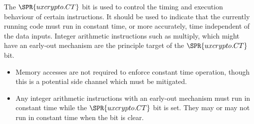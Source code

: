 The $\SPR{uxcrypto.CT}$ bit is used to control the timing and execution
behaviour of certain instructions.
It should be used to indicate that the currently running code must run
in constant time, or more accurately, time independent of the data
inputs.
Integer arithmetic instructions such as multiply, which might have an
early-out mechanism are the principle target of the $\SPR{uxcrypto.CT}$ bit.
\begin{itemize}
\item Memory accesses are not required to enforce constant time operation,
      though this is a potential side channel which must be mitigated.
\item Any integer arithmetic instructions with an early-out mechanism must
      run in constant time while the $\SPR{uxcrypto.CT}$ bit is set.
      They may or may not run in constant time when the bit is clear.
\end{itemize}

